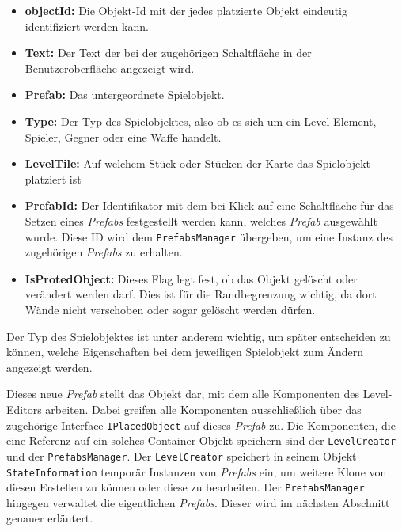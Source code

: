 \begin{itemize}
	\item \textbf{objectId:} Die Objekt-Id mit der jedes platzierte Objekt eindeutig identifiziert werden kann.
	\item \textbf{Text:} Der Text der bei der zugehörigen Schaltfläche in der Benutzeroberfläche angezeigt wird.
	\item \textbf{Prefab:} Das untergeordnete Spielobjekt.
	\item \textbf{Type:} Der Typ des Spielobjektes, also ob es sich um ein Level-Element, Spieler, Gegner oder eine Waffe handelt.
	\item \textbf{LevelTile:} Auf welchem Stück oder Stücken der Karte das Spielobjekt platziert ist 
	\item \textbf{PrefabId:} Der Identifikator mit dem bei Klick auf eine Schaltfläche für das Setzen eines \textit{Prefabs} festgestellt werden kann, welches \textit{Prefab} ausgewählt wurde. Diese ID wird dem \texttt{PrefabsManager} übergeben, um eine Instanz des zugehörigen \textit{Prefabs} zu erhalten.
	\item \textbf{IsProtedObject:} Dieses Flag legt fest, ob das Objekt gelöscht oder verändert werden darf. Dies ist für die Randbegrenzung wichtig, da dort Wände nicht verschoben oder sogar gelöscht werden dürfen.
\end{itemize}

Der Typ des Spielobjektes ist unter anderem wichtig, um später entscheiden zu können, welche Eigenschaften bei dem jeweiligen Spielobjekt zum Ändern angezeigt werden. 

Dieses neue \textit{Prefab} stellt das Objekt dar, mit dem alle Komponenten des Level-Editors arbeiten. Dabei greifen alle Komponenten ausschließlich über das zugehörige Interface \texttt{IPlacedObject} auf dieses \textit{Prefab} zu. Die Komponenten, die eine Referenz auf ein solches Container-Objekt speichern sind der \texttt{LevelCreator} und der \texttt{PrefabsManager}. Der \texttt{LevelCreator} speichert in seinem Objekt \texttt{StateInformation} temporär Instanzen von \textit{Prefabs} ein, um weitere Klone von diesen Erstellen zu können oder diese zu bearbeiten. Der \texttt{PrefabsManager} hingegen verwaltet die eigentlichen \textit{Prefabs}. Dieser wird im nächsten Abschnitt genauer erläutert.

